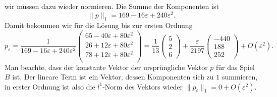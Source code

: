 wir müssen dazu wieder normieren.
Die Summe der Komponenten ist
\[
\|p\|_1
=
169 - 16 \varepsilon + 240 \varepsilon^2.
\]
Damit bekommen wir für die Lösung bis zur ersten Ordnung
\[
p_\varepsilon
=
\frac{1}{ 169 - 16 \varepsilon + 240 \varepsilon^2}
\begin{pmatrix}
65-40\varepsilon+80\varepsilon^2\\
26+12\varepsilon+80\varepsilon^2\\
78+12\varepsilon+80\varepsilon^2\\
\end{pmatrix}
=
\frac{1}{13}
\begin{pmatrix} 5\\2\\6 \end{pmatrix}
+
\frac{\varepsilon}{2197}
\begin{pmatrix}
-440\\188\\252
\end{pmatrix}
+
O(\varepsilon^2).
\]
Man beachte, dass der konstante Vektor der ursprüngliche Vektor $p$
für das Spiel $B$ ist.
Der lineare Term ist ein Vektor, dessen Komponenten sich zu $1$ summieren,
in erster Ordnung ist also die $l^1$-Norm des Vektors wieder 
$\|p_\varepsilon\|_1=0+O(\varepsilon^2)$.


